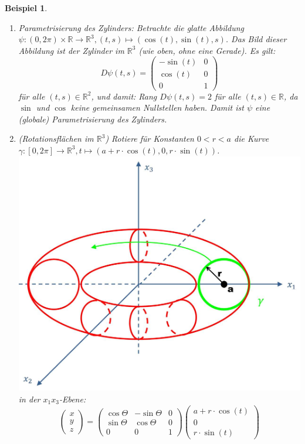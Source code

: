 \documentclass[a4paper,11pt,notitlepage]{report}
\newtheorem{example}{Beispiel}[chapter]
\newcommand{\R}{{\ensuremath{\mathbb{R}}}}
\begin{document}
\begin{example}
	\begin{enumerate}
		\item Parametrisierung des Zylinders:
			\newline
			Betrachte die glatte Abbildung $\psi \colon (0, 2 \pi) \times \R \rightarrow \R^3, (t,s) \mapsto (\cos{(t)}, \sin{(t)}, s)$. Das Bild dieser Abbildung ist der Zylinder im $\R^3$ (wie oben, ohne eine Gerade).
			Es gilt:
			$$D\psi(t,s) = \begin{pmatrix} -\sin{(t)} & 0 \\ \cos{(t)} & 0 \\ 0 & 1  \end{pmatrix} $$ für alle $(t,s) \in \R^2$, und damit:
			Rang $D \psi(t,s)=2$ für alle $(t,s) \in \R$, da $\sin$ und $\cos$ keine gemeinsamen Nullstellen haben.
			\newline
			Damit ist $\psi$ eine (globale) Parametrisierung des Zylinders.
			
		\item (Rotationsflächen im $\R^3$)
			\newline
			Rotiere für Konstanten $0 < r < a$ die Kurve $\gamma \colon [0,2\pi] \rightarrow \R^3, t \mapsto (a + r \cdot \cos{(t)}, 0, r \cdot \sin{(t)})$.
			\includegraphics[scale=0.4]{images/Torus_Rotation.jpg} in der $x_1 x_3$-Ebene:
			$$\begin{pmatrix}
				x \\ y \\z
			\end{pmatrix} = \begin{pmatrix}
			\cos{\Theta} & -\sin{\Theta} & 0 \\ \sin{\Theta} & \cos{\Theta} & 0 \\ 0 & 0 & 1
\end{pmatrix} \begin{pmatrix}
	a + r \cdot \cos{(t)} \\ 0 \\ r \cdot \sin{(t)}
\end{pmatrix}$$


\end{enumerate}
\end{example}
\end{document}

